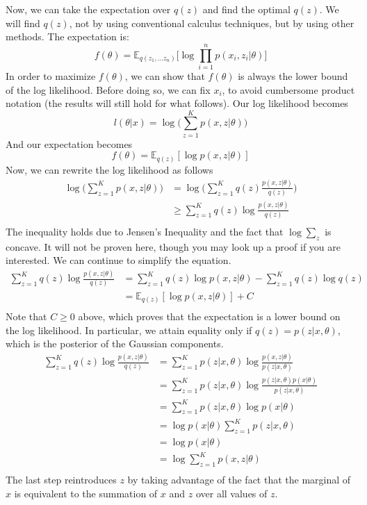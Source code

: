 \documentclass{article}
\begin{document}
Now, we can take the expectation over $q(z)$ and find the optimal $q(z)$. We will find $q(z)$, not by using conventional calculus techniques, but by using other methods. The expectation is:
\begin{equation}
	f(\theta) = \mathbb{E}_{q(z_{1}, \ldots z_{n})} \Bigg[ \log \prod_{i = 1}^{n} p(x_{i}, z_{i} | \theta) \Bigg]
\end{equation}
In order to maximize $f(\theta)$, we can show that $f(\theta)$ is always the lower bound of the log likelihood. Before doing so, we can fix $x_{i}$, to avoid cumbersome product notation (the results will still hold for what follows). Our log likelihood becomes
\begin{equation}
	l(\theta | x) = \log \Bigg(\sum\limits_{z = 1}^{K} p(x, z | \theta) \Bigg)
\end{equation}
And our expectation becomes
\begin{equation}
	f(\theta) = \mathbb{E}_{q(z)} [ \log p(x, z | \theta)]
\end{equation}
Now, we can rewrite the log likelihood as follows
\begin{align*}
	\log \Bigg(\sum\limits_{z = 1}^{K} p(x, z | \theta) \Bigg)
		&= \log \Bigg(\sum\limits_{z = 1}^{K} q(z) \frac{p(x, z | \theta)}{q(z)} \Bigg) \\
		&\geq \sum\limits_{z = 1}^{K} q(z) \log \frac{p(x, z | \theta)}{q(z)} \\
\end{align*}
The inequality holds due to Jensen's Inequality and the fact that $\log \sum_{z}$ is concave. It will not be proven here, though you may look up a proof if you are interested. We can continue to simplify the equation.
\begin{align*}
	\sum\limits_{z = 1}^{K} q(z) \log \frac{p(x, z | \theta)}{q(z)}
		&= \sum\limits_{z = 1}^{K} q(z) \log p(x, z | \theta) - \sum\limits_{z = 1}^{K} q(z) \log q(z) \\
		&= \mathbb{E}_{q(z)} [\log p(x, z | \theta)] + C \\
\end{align*}
Note that $C \geq 0$ above, which proves that the expectation is a lower bound on the log likelihood. In particular, we attain equality only if $q(z) = p(z | x, \theta)$, which is the posterior of the Gaussian components.
\begin{align*}
	\sum\limits_{z = 1}^{K} q(z) \log \frac{p(x, z | \theta)}{q(z)}
		&= \sum\limits_{z = 1}^{K} p(z | x, \theta) \log \frac{p(x, z | \theta)}{p(z | x, \theta)} \\
		&= \sum\limits_{z = 1}^{K} p(z | x, \theta) \log \frac{p(z | x, \theta)p(x | \theta)}{p(z | x, \theta)} \\
		&= \sum\limits_{z = 1}^{K} p(z | x, \theta) \log p(x | \theta) \\
		&= \log p(x | \theta) \sum\limits_{z = 1}^{K} p(z | x, \theta) \\
		&= \log p(x | \theta) \\
		&= \log \sum\limits_{z = 1}^{K} p(x, z | \theta) \\
\end{align*}
The last step reintroduces $z$ by taking advantage of the fact that the marginal of $x$ is equivalent to the summation of $x$ and $z$ over all values of $z$.
\end{document}
